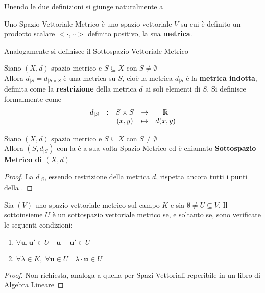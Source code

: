 Unendo le due definizioni si giunge naturalmente a
\begin{definition}
	Uno Spazio Vettoriale Metrico è uno spazio vettoriale $V$ su cui è definito un prodotto scalare $<\cdot,\cdot·>$ definito positivo, la sua \textbf{metrica}.
	\begin{note}
		Analogamente si definisce il Sottospazio Vettoriale Metrico
	\end{note}
\end{definition}

\begin{definition}
	\label{def:metr_indotta}
	Siano $(X,d)$ spazio metrico e $S \subseteq X$ con $S \neq \emptyset$\\
	Allora $d_{|S} = d_{|S \times S}$ è una metrica su $S$, cioè la metrica $d_{|S}$ è la \textbf{metrica indotta}, definita come la \textbf{restrizione} della metrica $d$ ai soli elementi di $S$. Si definisce formalmente come
	$$\begin{array}{ccccc} {d_{|S}} & : & {S \times S} & \to & {\mathbb{R}} \\ & & {(x,y)} & \mapsto & {d(x,y)} \\ \end{array}$$
\end{definition}

\begin{definition}
	Siano $(X,d)$ spazio metrico e $S \subseteq X$ con $S \neq \emptyset$\\
	Allora $(S,d_{|S})$ con la  è a sua volta Spazio Metrico ed è chiamato \textbf{Sottospazio Metrico di $(X,d)$}
	\begin{proof}
		La $d_{|S}$, essendo restrizione della metrica $d$, rispetta ancora tutti i punti della .
	\end{proof}
\end{definition}

\begin{proposition}
	\label{prop:subspace_condition}
	Sia $(V)$ uno spazio vettoriale metrico sul campo $K$ e sia $\emptyset \neq U \subseteq V$. Il sottoinsieme $U$ è un sottospazio vettoriale metrico se, e soltanto se, sono verificate le seguenti condizioni:
	\begin{enumerate}
		\item $\forall \mathbf{u}, \mathbf{u'} \in U \quad \mathbf{u} + \mathbf{u'} \in U$
		\item $\forall \lambda \in K,\; \forall \mathbf{u} \in U \quad \lambda \cdot \mathbf{u} \in U$
	\end{enumerate}
	\begin{proof}
		Non richiesta, analoga a quella per Spazi Vettoriali reperibile in un libro di Algebra Lineare
	\end{proof}
\end{proposition}

